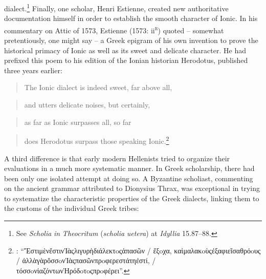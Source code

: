 dialect.\footnote{See \textit{Scholia} \textit{in} \textit{Theocritum} (\textit{scholia} \textit{uetera}) at \textit{Idyllia} 15.87–88.} Finally, one scholar, Henri Estienne, created new authoritative documentation himself in order to establish the smooth character of Ionic. In his commentary on Attic of 1573, Estienne (1573: ii\textsc{\textsuperscript{r}}) quoted – somewhat pretentiously, one might say – a Greek epigram of his own invention to prove the historical primacy of Ionic as well as its sweet and delicate character. He had prefixed this poem to his edition of the Ionian historian Herodotus, published three years earlier:

\begin{quote}
The Ionic dialect is indeed sweet, far above all,
\end{quote}

\begin{quote}
and utters delicate noises, but certainly,
\end{quote}

\begin{quote}
as far as Ionic surpasses all, so far
\end{quote}

\begin{quote}
does Herodotus surpass those speaking Ionic.\footnote{\citet[8]{Estienne1570}: “ἜστιμὲνἔστινἸὰςλιγυρὴδιάλεκτoςἁπασῶν / ἔξoχα, καὶμαλακoὺςἐξαφιεῖσαθρόoυς\text{\textgreek{;}} / ἀλλὰγὰρὅσσoνἸὰςπασῶνπρoφερεστάτηἐστί, / τόσσoνἰαζόντωνἩρόδoτoςπρoφέρει”.}
\end{quote}

A third difference is that early modern Hellenists tried to organize their evaluations in a much more systematic manner. In Greek scholarship, there had been only one isolated attempt at doing so. A Byzantine scholiast, commenting on the ancient grammar attributed to Dionysius Thrax, was exceptional in trying to systematize the characteristic properties of the Greek dialects, linking them to the customs of the individual Greek tribes:

